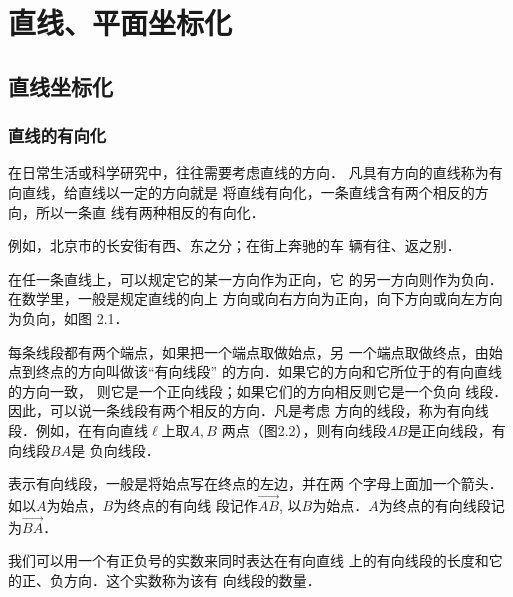 \chapter{直线、平面坐标化}
\section{直线坐标化}

\subsection{直线的有向化}
在日常生活或科学研究中，往往需要考虑直线的方向．
凡具有方向的直线称为有向直线，给直线以一定的方向就是
将直线有向化，一条直线含有两个相反的方向，所以一条直
线有两种相反的有向化．

例如，北京市的长安街有西、东之分；在街上奔驰的车
辆有往、返之别．

在任一条直线上，可以规定它的某一方向作为正向，它
的另一方向则作为负向．在数学里，一般是规定直线的向上
方向或向右方向为正向，向下方向或向左方向为负向，如图
2.1．
\begin{figure}[htp]
    \centering
{}
    \caption{}
\end{figure}

每条线段都有两个端点，如果把一个端点取做始点，另
一个端点取做终点，由始点到终点的方向叫做该“有向线段”
的方向．如果它的方向和它所位于的有向直线的方向一致，
则它是一个正向线段；如果它们的方向相反则它是一个负向
线段．因此，可以说一条线段有两个相反的方向．凡是考虑
方向的线段，称为有向线段．例如，在有向直线$\ell$上取$A,B$
两点（图2.2），则有向线段$AB$是正向线段，有向线段$BA$是
负向线段．
\begin{figure}[htp]
    \centering
{}
    \caption{}
\end{figure}

表示有向线段，一般是将始点写在终点的左边，并在两
个字母上面加一个箭头．如以$A$为始点，$B$为终点的有向线
段记作$\Vec{AB}$, 以$B$为始点．$A$为终点的有向线段记为$\Vec{BA}$．

我们可以用一个有正负号的实数来同时表达在有向直线
上的有向线段的长度和它的正、负方向．这个实数称为该有
向线段的数量．

